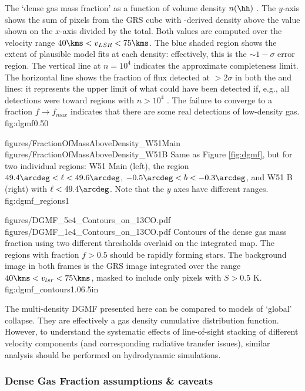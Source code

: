 {The `dense gas mass fraction' as a function of volume density $n(\hh)$ \percc.
The $y$-axis shows the sum of \thirteenco pixels from the GRS cube with
\formaldehyde-derived density above the value shown on the $x$-axis divided by
the total.  Both values are computed over the velocity range $40 \kms < v_{LSR}
< 75 \kms$.  The blue shaded region shows the extent of plausible model fits at
each density: effectively, this is the $\sim1-\sigma$ error region.  The
vertical line at $n=10^4$ \percc indicates the approximate completeness limit.
The horizontal line shows the fraction of \thirteenco flux detected at
$>2\sigma$ in both the \oneone and \twotwo lines: it represents the upper limit
of what could have been detected if, e.g., all \formaldehyde detections were
toward regions with $n>10^4$ \percc.  The failure to converge to a fraction
$f\rightarrow f_{max}$ indicates that there are some real detections of
low-density gas.}
{fig:dgmf}{0.5}{0}

\FigureTwo
{figures/FractionOfMassAboveDensity_W51Main}
{figures/FractionOfMassAboveDensity_W51B}
{Same as Figure \ref{fig:dgmf}, but for two individual regions: W51 Main
(left), the region $49.4\arcdeg < \ell < 49.6\arcdeg$, $-0.5\arcdeg < b <
-0.3\arcdeg$, and W51 B (right) with $\ell < 49.4\arcdeg$.  Note
that the $y$ axes have different ranges.}
{fig:dgmf_regions}{1}

\FigureTwoAA
{figures/DGMF_5e4_Contours_on_13CO.pdf}
{figures/DGMF_1e4_Contours_on_13CO.pdf}
{Contours of the dense gas mass fraction using two different thresholds
overlaid on the integrated \thirteenco map.  The regions with fraction $f>0.5$
should be rapidly forming stars.  The background image in both frames is the
GRS \thirteenco image integrated over the range $40\kms < v_{lsr} < 75 \kms$,
masked to include only pixels with $S>0.5$ K. }
{fig:dgmf_contours}{1.0}{6.5in}

The multi-density DGMF presented here can be compared to models of `global'
collapse.  They are effectively a gas density cumulative distribution function.
However, to understand the systematic effects of line-of-sight stacking of
different velocity components (and corresponding radiative transfer issues),
similar analysis should be performed on hydrodynamic simulations.

\subsubsection{Dense Gas Fraction assumptions \& caveats}

